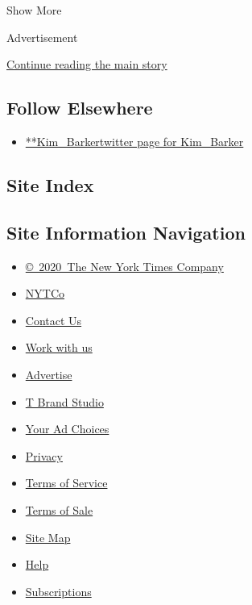 Show More

Advertisement

\protect\hyperlink{after-mid2}{Continue reading the main story}

\hypertarget{follow-elsewhere}{%
\subsection{Follow Elsewhere}\label{follow-elsewhere}}

\begin{itemize}
\tightlist
\item
  \href{https://twitter.com/Kim_Barker}{**Kim\_Barkertwitter page for
  Kim\_Barker}
\end{itemize}

\hypertarget{site-index}{%
\subsection{Site Index}\label{site-index}}

\hypertarget{site-information-navigation}{%
\subsection{Site Information
Navigation}\label{site-information-navigation}}

\begin{itemize}
\tightlist
\item
  \href{https://help.nytimes3xbfgragh.onion/hc/en-us/articles/115014792127-Copyright-notice}{©~2020~The
  New York Times Company}
\end{itemize}

\begin{itemize}
\tightlist
\item
  \href{https://www.nytco.com/}{NYTCo}
\item
  \href{https://help.nytimes3xbfgragh.onion/hc/en-us/articles/115015385887-Contact-Us}{Contact
  Us}
\item
  \href{https://www.nytco.com/careers/}{Work with us}
\item
  \href{https://nytmediakit.com/}{Advertise}
\item
  \href{http://www.tbrandstudio.com/}{T Brand Studio}
\item
  \href{https://www.nytimes3xbfgragh.onion/privacy/cookie-policy\#how-do-i-manage-trackers}{Your
  Ad Choices}
\item
  \href{https://www.nytimes3xbfgragh.onion/privacy}{Privacy}
\item
  \href{https://help.nytimes3xbfgragh.onion/hc/en-us/articles/115014893428-Terms-of-service}{Terms
  of Service}
\item
  \href{https://help.nytimes3xbfgragh.onion/hc/en-us/articles/115014893968-Terms-of-sale}{Terms
  of Sale}
\item
  \href{https://spiderbites.nytimes3xbfgragh.onion}{Site Map}
\item
  \href{https://help.nytimes3xbfgragh.onion/hc/en-us}{Help}
\item
  \href{https://www.nytimes3xbfgragh.onion/subscription?campaignId=37WXW}{Subscriptions}
\end{itemize}
